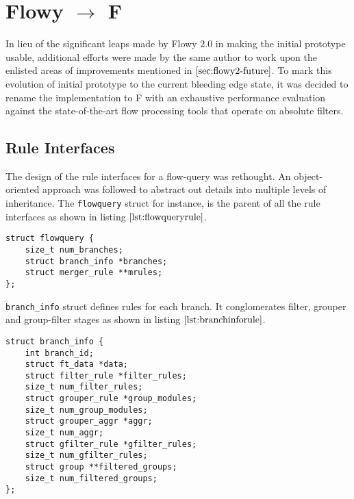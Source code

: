 \chapter{Flowy $\longrightarrow$ F}\label{ch:f}

In lieu of the significant leaps made by Flowy $2.0$ in making the initial prototype usable, additional efforts were made by the same author to work upon the enlisted areas of improvements mentioned in $\ref{sec:flowy2-future}$. To mark this evolution of initial prototype to the current bleeding edge state, it was decided to rename the implementation to F \cite{jschauer:2012} with an exhaustive performance evaluation against the state-of-the-art flow processing tools \cite{sromig:2000, phaag:2006} that operate on absolute filters.

\section{Rule Interfaces}\label{sec:rule-interfaces}
The design of the rule interfaces for a flow-query was rethought. An object-oriented approach was followed to abstract out details into multiple levels of inheritance. The \texttt{flowquery} struct for instance, is the parent of all the rule interfaces as shown in listing $\ref{lst:flowqueryrule}$.
\begin{lstlisting}
struct flowquery {
	size_t num_branches;
	struct branch_info *branches;
	struct merger_rule **mrules;
};
\end{lstlisting}

\texttt{branch\_info} struct defines rules for each branch. It conglomerates filter, grouper and group-filter stages as shown in listing $\ref{lst:branchinforule}$. 
\begin{lstlisting}
struct branch_info {
	int branch_id;
	struct ft_data *data;
	struct filter_rule *filter_rules;
	size_t num_filter_rules;
	struct grouper_rule *group_modules;
	size_t num_group_modules;
	struct grouper_aggr *aggr;
	size_t num_aggr;
	struct gfilter_rule *gfilter_rules;
	size_t num_gfilter_rules;
	struct group **filtered_groups;
	size_t num_filtered_groups;
};
\end{lstlisting}

